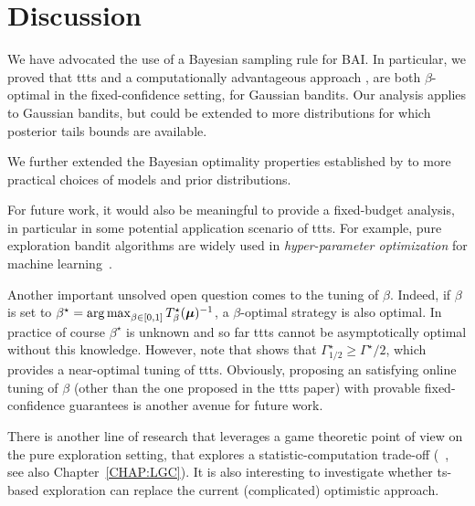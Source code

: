 \section{Discussion}\label{sec:t3c.discussion}

We have advocated the use of a Bayesian sampling rule for BAI. In particular, we proved that \gls{ttts} and a computationally advantageous approach \TCC, are both $\beta$-optimal in the fixed-confidence setting, for Gaussian bandits. Our analysis applies to Gaussian bandits, but could be extended to more distributions for which posterior tails bounds are available.

We further extended the Bayesian optimality properties established by \cite{russo2016ttts} to more practical choices of models and prior distributions. 

For future work, it would also be meaningful to provide a fixed-budget analysis, in particular in some potential application scenario of \gls{ttts}. For example, pure exploration bandit algorithms are widely used in \emph{hyper-parameter optimization} for machine learning~\citep{hoffman2014bayesgap,li2017hyperband,shang2019dttts}.

Another important unsolved open question comes to the tuning of $\beta$. Indeed, if $\beta$ is set to $\beta^\star = \operatorname*{arg\,max}_{\beta \in [0,1]} T_{\beta}^\star({\boldsymbol \mu})^{-1}$, a $\beta$-optimal strategy is also optimal. In practice of course $\beta^\star$ is unknown and so far \gls{ttts} cannot be asymptotically optimal without this knowledge. However, note that \cite{russo2016ttts} shows that $\Gamma^\star_{1/2} \geq \Gamma^{\star}/2$, which provides a near-optimal tuning of \gls{ttts}. Obviously, proposing an satisfying online tuning of $\beta$ (other than the one proposed in the \gls{ttts} paper) with provable fixed-confidence guarantees is another avenue for future work.

There is another line of research that leverages a game theoretic point of view on the pure exploration setting, that explores a statistic-computation trade-off (~\citealt{menard2019lma,degenne2019game}, see also Chapter~\ref{CHAP:LGC}). It is also interesting to investigate whether \gls{ts}-based exploration can replace the current (complicated) optimistic approach.



